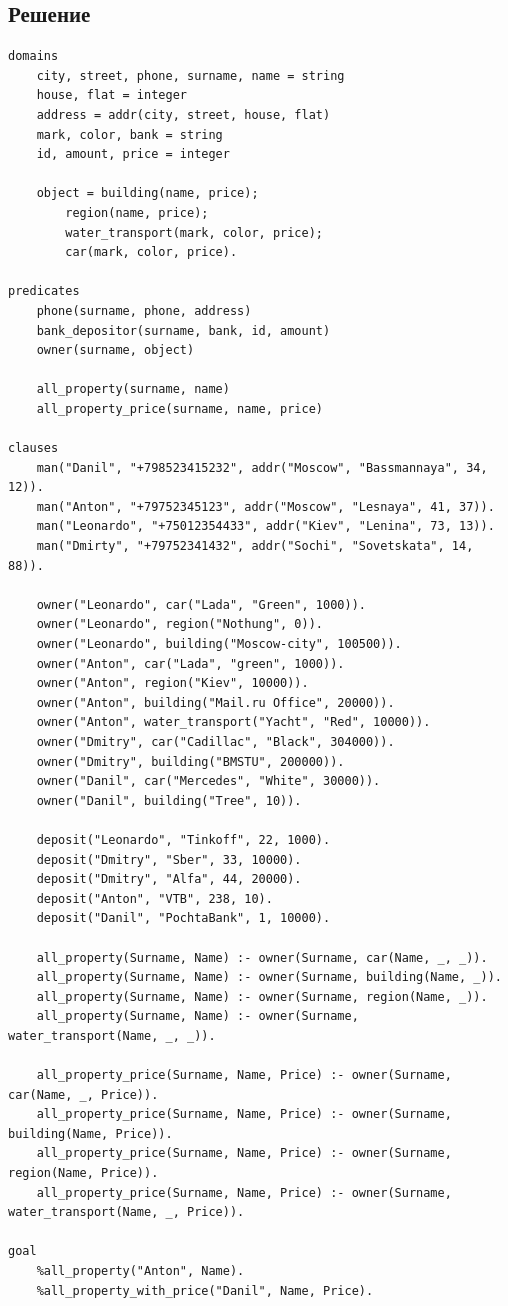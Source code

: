 \documentclass[12pt]{report}
\begin{document}
\subsection*{Решение}
\begin{lstlisting}
domains
	city, street, phone, surname, name = string
	house, flat = integer
	address = addr(city, street, house, flat)
	mark, color, bank = string
	id, amount, price = integer

	object = building(name, price);
		region(name, price);
		water_transport(mark, color, price);
		car(mark, color, price).

predicates
	phone(surname, phone, address)
	bank_depositor(surname, bank, id, amount)
	owner(surname, object)

	all_property(surname, name)
	all_property_price(surname, name, price)

clauses
	man("Danil", "+798523415232", addr("Moscow", "Bassmannaya", 34, 12)).
	man("Anton", "+79752345123", addr("Moscow", "Lesnaya", 41, 37)).
	man("Leonardo", "+75012354433", addr("Kiev", "Lenina", 73, 13)).
	man("Dmirty", "+79752341432", addr("Sochi", "Sovetskata", 14, 88)).

	owner("Leonardo", car("Lada", "Green", 1000)).
	owner("Leonardo", region("Nothung", 0)).
	owner("Leonardo", building("Moscow-city", 100500)).
	owner("Anton", car("Lada", "green", 1000)).
	owner("Anton", region("Kiev", 10000)).
	owner("Anton", building("Mail.ru Office", 20000)).
	owner("Anton", water_transport("Yacht", "Red", 10000)).
	owner("Dmitry", car("Cadillac", "Black", 304000)).
	owner("Dmitry", building("BMSTU", 200000)).
	owner("Danil", car("Mercedes", "White", 30000)).
	owner("Danil", building("Tree", 10)).
	
	deposit("Leonardo", "Tinkoff", 22, 1000).
	deposit("Dmitry", "Sber", 33, 10000).
	deposit("Dmitry", "Alfa", 44, 20000).
	deposit("Anton", "VTB", 238, 10).
	deposit("Danil", "PochtaBank", 1, 10000).
	
	all_property(Surname, Name) :- owner(Surname, car(Name, _, _)).
	all_property(Surname, Name) :- owner(Surname, building(Name, _)).
	all_property(Surname, Name) :- owner(Surname, region(Name, _)).
	all_property(Surname, Name) :- owner(Surname, water_transport(Name, _, _)).
	
	all_property_price(Surname, Name, Price) :- owner(Surname, car(Name, _, Price)).
	all_property_price(Surname, Name, Price) :- owner(Surname, building(Name, Price)).
	all_property_price(Surname, Name, Price) :- owner(Surname, region(Name, Price)).
	all_property_price(Surname, Name, Price) :- owner(Surname, water_transport(Name, _, Price)).

goal
	%all_property("Anton", Name).
	%all_property_with_price("Danil", Name, Price).

\end{lstlisting}


	
\end{document}
